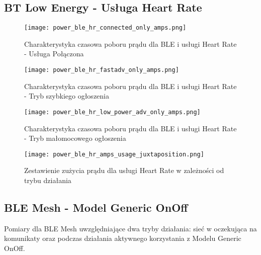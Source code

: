 \subsection{BT Low Energy - Usługa Heart Rate}

\lipsum[1-3]
\begin{figure}[!htb]
	\centering \texttt{[image: power\_ble\_hr\_connected\_only\_amps.png]}
	\caption{Charakterystyka czasowa poboru prądu dla BLE i usługi Heart Rate - Usługa Połączona}
	\label{rys:power_ble_hr_connected_only_amps}
\end{figure}

\lipsum[1-3]
\begin{figure}[!htb]
	\centering \texttt{[image: power\_ble\_hr\_fastadv\_only\_amps.png]}
	\caption{Charakterystyka czasowa poboru prądu dla BLE i usługi Heart Rate - Tryb szybkiego ogłoszenia}
	\label{rys:power_ble_hr_fastadv_only_amps}
\end{figure}

\lipsum[1-3]
\begin{figure}[!htb]
	\centering \texttt{[image: power\_ble\_hr\_low\_power\_adv\_only\_amps.png]}
	\caption{Charakterystyka czasowa poboru prądu dla BLE i usługi Heart Rate - Tryb małomocowego ogłoszenia}
	\label{rys:power_ble_hr_low_power_adv_only_amps}
\end{figure}


\lipsum[1-2]
\begin{figure}[!htb]
	\centering \texttt{[image: power\_ble\_hr\_amps\_usage\_juxtaposition.png]}
	\caption{Zestawienie zużycia prądu dla usługi Heart Rate w zależności od trybu działania}
	\label{rys:power_ble_hr_amps_usage_juxtaposition}
\end{figure}
\lipsum[1-3]

\subsection{BLE Mesh - Model Generic OnOff}

Pomiary dla BLE Mesh uwzględniające dwa tryby działania: sieć w oczekująca na komunikaty oraz podczas działania aktywnego korzystania z Modelu Generic OnOff.

